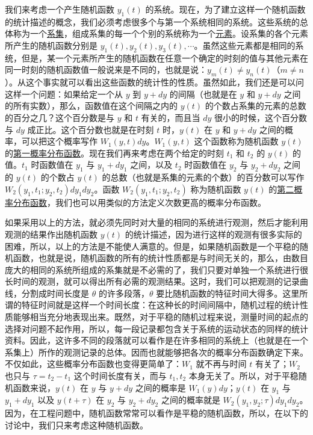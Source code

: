 我们来考虑一个产生随机函数 $ y_1(t) $ 的系统。现在，为了建立这样一个随机函数的统计描述的概念，我们必须考虑很多个与第一个系统相同的系统。这些系统的总体称为一个\underline{系集}，组成系集的每一个个别的系统称为一个\underline{元素}。设系集的各个元素所产生的随机函数分别是 $ y_1(t), y_2(t), y_3(t), \cdots $。虽然这些元素都是相同的系统，但是，某一个元素所产生的随机函数在任意一个确定的时刻的值与其他元素在同一时刻的随机函数值一般说来是不同的，也就是说：$ y_m(t) \neq y_n(t) $（$ m \neq n $）。从这个事实就可以看出这些函数的统计性的性质。虽然如此，我们还是可以问这样一个问题：如果给定一个从 $ y $ 到 $ y + dy $ 的间隔（也就是在 $ y $ 和 $ y + dy $ 之间的所有实数），那么，函数值在这个间隔之内的 $ y(t) $ 的个数占系集的元素的总数的百分之几？这个百分数是与 $ y $ 和 $ t $ 有关的，而且当 $ dy $ 很小的时候，这个百分数与 $ dy $ 成正比。这个百分数也就是在时刻 $ t $ 时，$ y(t) $ 在 $ y $ 和 $ y + dy $ 之间的概率，可以把这个概率写作 $ W_1(y,t)dy $。$ W_1(y,t) $ 这个函数称为随机函数 $ y(t) $ 的\underline{第一概率分布函数}。现在我们再来考虑在两个给定的时刻 $ t_1 $ 和 $ t_2 $ 的 $ y(t) $ 的值。$ t_1 $ 时函数值在 $ y_1 $ 与 $ y_1 + dy_1 $ 之间，以及 $ t_2 $ 时函数值在 $ y_2 $ 与 $ y_2 + dy_2 $ 之间的 $ y(t) $ 的个数占 $ y(t) $ 的总数（也就是系集的元素的个数）的百分数可以写作 $ W_2(y_1, t_1; y_2, t_2)dy_1dy_2 $。函数 $ W_2(y_1, t_1; y_2, t_2) $ 称为随机函数 $ y(t) $ 的\underline{第二概率分布函数}，我们也可以用类似的方法定义次数更高的概率分布函数。

如果采用以上的方法，就必须先同时对大量的相同的系统进行观测，然后才能利用观测的结果作出随机函数 $ y(t) $ 的统计描述，因为进行这样的观测有很多实际的困难，所以，以上的方法是不能使人满意的。但是，如果随机函数是一个平稳的随机函数，也就是说，随机函数的所有的统计性质都是与时间无关的，那么，由数目庞大的相同的系统所组成的系集就是不必需的了，我们只要对单独一个系统进行很长时间的观测，就可以得出所有必需的观测结果。这时，我们可以把观测的记录曲线，分割成时间长度是 $ \theta $ 的许多段落，$ \theta $ 要比随机函数的特征时间大得多。这里所谓的特征时间就是这样一个时间长度：在这种长的时间间隔中，随机过程的统计性质能够相当充分地表现出来。既然，对于平稳的随机过程来说，测量时间的起点的选择对问题不起作用，所以，每一段记录都包含关于系统的运动状态的同样的统计资料。因此，这许多不同的段落就可以看作是在许多相同的系统上（也就是在一个系集上）所作的观测记录的总体。因而也就能够把各次的概率分布函数确定下来。不仅如此，这些概率分布函数也变得更简单了：$ W_1 $ 就不再与时间 $ t $ 有关了；$ W_2 $ 也只与 $ \tau = t_2 - t_1 $ 这个时间长度有关，而与 $ t_1, t_2 $ 本身无关了。所以，对于平稳随机函数来说，$ y(t) $ 在 $ y $ 与 $ y + dy $ 之间的概率是 $ W_1(y)dy $；$ y(t) $ 在 $ y_1 $ 与 $ y_1 + dy_1 $ 以及 $ y(t + \tau) $ 在 $ y_2 $ 与 $ y_2 + dy_2 $ 之间的概率就是 $ W_2(y_1, y_2; \tau)dy_1dy_2 $。因为，在工程问题中，随机函数常常可以看作是平稳的随机函数，所以，在以下的讨论中，我们只来考虑这种随机函数。

